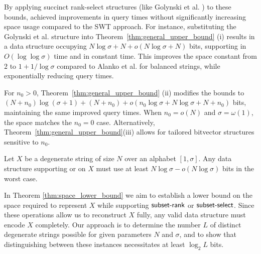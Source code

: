 \noindent By applying succinct rank-select structures (like Golynski et al. \cite{golynski2006rank}) to these bounds, \cite{bille2023rank} achieved improvements in query times without significantly increasing space usage compared to the SWT approach. For instance, substituting the Golynski et al. structure into Theorem~\ref{thm:general_upper_bound} (i) results in a data structure occupying $N\log\sigma + N + o(N\log\sigma + N)$ bits, supporting \Drank{} in $O(\log\log\sigma)$ time and \Dselect{} in constant time. This improves the space constant from $2$ to $1 + 1/\log\sigma$ compared to Alanko et al. \cite{SubsetWT} for balanced strings, while exponentially reducing query times.

\noindent For $n_0 > 0$, Theorem~\ref{thm:general_upper_bound} (ii) modifies the bounds to $(N+n_0)\log(\sigma+1) + (N+n_0) + o(n_0\log\sigma + N\log\sigma + N + n_0)$ bits, maintaining the same improved query times. When $n_0 = o(N)$ and $\sigma = \omega(1)$, the space matches the $n_0=0$ case. Alternatively, Theorem~\ref{thm:general_upper_bound}(iii) allows for tailored bitvector structures sensitive to $n_0$.

\begin{theorem}
    \label{thm:space_lower_bound}
    Let $X$ be a degenerate string of size $N$ over an alphabet $[1,\sigma]$. Any data structure supporting \Drank{} or \Dselect{} on $X$ must use at least $N\log \sigma - o(N\log \sigma)$ bits in the worst case.
\end{theorem}

\noindent In Theorem \ref{thm:space_lower_bound} we aim to establish a lower bound on the space required to represent $X$ while supporting $\textsf{subset-rank}{}$ or $\textsf{subset-select}{}$. Since these operations allow us to reconstruct $X$ fully, any valid data structure must encode $X$ completely. Our approach is to determine the number $L$ of distinct degenerate strings possible for given parameters $N$ and $\sigma$, and to show that distinguishing between these instances necessitates at least $\log_2 L$ bits.

